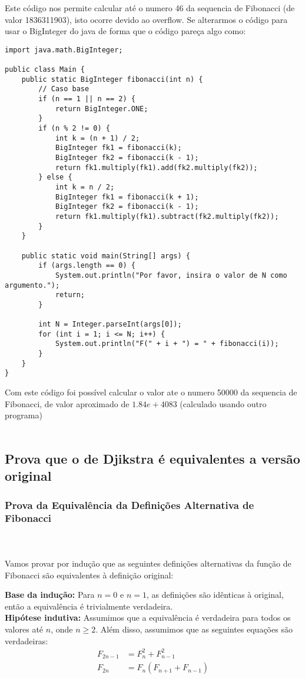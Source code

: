 \documentclass[11pt,reqno,a4paper]{amsart}
\begin{document}
Este código nos permite calcular até o numero 46 da sequencia de Fibonacci (de valor 1836311903), isto ocorre devido ao overflow. Se alterarmos o código para usar o BigInteger do java de forma que o código pareça algo como:
\newpage
\begin{verbatim}
import java.math.BigInteger;

public class Main {
    public static BigInteger fibonacci(int n) {
        // Caso base
        if (n == 1 || n == 2) {
            return BigInteger.ONE;
        }
        if (n % 2 != 0) {
            int k = (n + 1) / 2;
            BigInteger fk1 = fibonacci(k);
            BigInteger fk2 = fibonacci(k - 1);
            return fk1.multiply(fk1).add(fk2.multiply(fk2));
        } else {
            int k = n / 2;
            BigInteger fk1 = fibonacci(k + 1);
            BigInteger fk2 = fibonacci(k - 1);
            return fk1.multiply(fk1).subtract(fk2.multiply(fk2));
        }
    }

    public static void main(String[] args) {
        if (args.length == 0) {
            System.out.println("Por favor, insira o valor de N como argumento.");
            return;
        }

        int N = Integer.parseInt(args[0]);
        for (int i = 1; i <= N; i++) {
            System.out.println("F(" + i + ") = " + fibonacci(i));
        }
    }
}
\end{verbatim}
Com este código foi possível calcular o valor ate o numero 50000 da sequencia de Fibonacci, de valor aproximado de $1.84e+4083$ (calculado usando outro programa)
\\
\\
\newpage
\subsection{Prova que o de Djikstra é equivalentes a versão original}
\subsubsection{Prova da Equivalência da Definições Alternativa de Fibonacci}
\
\\
\\
Vamos provar por indução que as seguintes definições alternativas da função de Fibonacci são equivalentes à definição original:

\textbf{Base da indução:}
Para $n = 0$ e $n = 1$, as definições são idênticas à original, então a equivalência é trivialmente verdadeira.
\\
\textbf{Hipótese indutiva:}
Assumimos que a equivalência é verdadeira para todos os valores até $n$, onde $n \geq 2$. Além disso, assumimos que as seguintes equações são verdadeiras:
\\
\begin{align*}
F_{2n-1} &= F_n^2 + F_{n-1}^2 \\
F_{2n} &= F_n(F_{n+1} + F_{n-1})
\end{align*}
\end{document}
